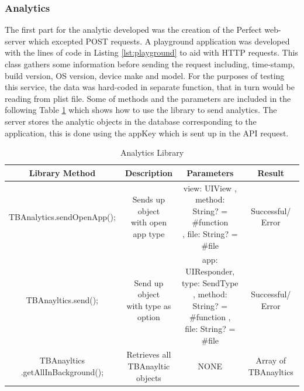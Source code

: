 \subsubsection{Analytics}

The first part for the analytic developed was the creation of the Perfect web-server which excepted POST requests. A playground application was developed with the lines of code in Listing \ref{lst:playground} to aid with HTTP requests. This class gathers some information before sending the request including, time-stamp, build version, OS version, device make and model. For the purposes of testing this service, the data was hard-coded in separate function, that in turn would be reading from plist file. Some of methods and the parameters are included in the following Table \ref{table:mob_analytics} which shows how to use the library to send analytics. The server stores the analytic objects in the database corresponding to the application, this is done using the appKey which is sent up in the API request.

\begin{table}[!h]
\centering
\caption{Analytics Library}
\label{table:mob_analytics}
\begin{tabular}{|c|c|c|c|}
\hline
\rowcolor{green!20}
Library Method                    & Description                        & Parameters    & Result              \\ 
\hline
TBAnalytics.sendOpenApp();        & \makecell{Sends up object\\ with open app type} &   \makecell{view: UIView , \\ method: String? = \#function \\ , file: String? = \#file } & Successful/ Error   \\ 
\hline
TBAnayltics.send();               & \makecell{Send up object \\ with type as option} &  \makecell{ app: UIResponder, \\ type: SendType \\ , method: String? = \#function ,  \\ file: String? = \#file } & Successful/ Error   \\ 
\hline
 \makecell{ TBAnayltics \\.getAllInBackground(); } & \makecell{Retrieves all \\ TBAnayltic objects }   & NONE        & Array of TBAnayltics \\ 
\hline
\end{tabular}%
\end{table}

